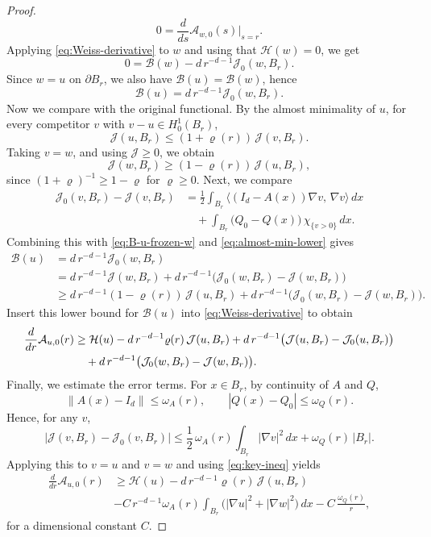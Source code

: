 \documentclass[reqno,11pt]{amsart}
\newcommand{\1}{\mathds{1}}  %
\numberwithin{equation}{section}
\begin{document}
\begin{proof}
\[
    0 = \frac{d}{ds}\mathcal A_{w,0}(s)\Big|_{s=r}.
\]
Applying \eqref{eq:Weiss-derivative} to $w$ and using that $\mathcal H(w) = 0$, we get
\[
    0 = \mathcal B(w)-d\,r^{-d-1}\mathcal J_0(w,B_r).
\]
Since $w=u$ on $\partial B_r$, we also have $\mathcal B(u)=\mathcal B(w)$, hence
\begin{equation}\label{eq:B-u-frozen-w}
\mathcal B(u)=d\,r^{-d-1}\mathcal J_0(w,B_r).
\end{equation}
Now we compare with the original functional. By the almost minimality of $u$, for every competitor $v$ with $v-u\in H^1_0(B_r)$,
\[
	\mathcal J(u,B_r)\le (1+\varrho(r))\,\mathcal J(v,B_r).
\]
Taking $v=w$, and using $\mathcal J\ge 0$, we obtain
\begin{equation}\label{eq:almost-min-lower}
	\mathcal J(w,B_r)\ge (1-\varrho(r))\,\mathcal J(u,B_r),
\end{equation}
since $(1+\varrho)^{-1}\ge 1-\varrho$ for $\varrho\ge 0$. Next, we compare 
\[
\begin{aligned}
	\mathcal J_0(v,B_r)-\mathcal J(v,B_r)
	&=\frac12\int_{B_r}\big\langle (I_d-A(x))\nabla v,\,\nabla v\big\rangle\,dx \\
	&\quad +\int_{B_r}\big(Q_0-Q(x)\big)\,\chi_{\{v>0\}}\,dx.
\end{aligned}
\]
Combining this with \eqref{eq:B-u-frozen-w} and \eqref{eq:almost-min-lower} gives
\begin{align*}
	\mathcal B(u)
	&= d\,r^{-d-1}\mathcal J_0(w,B_r) \\
	&= d\,r^{-d-1}\mathcal J(w,B_r)
	+d\,r^{-d-1}\big(\mathcal J_0(w,B_r)-\mathcal J(w,B_r)\big)\\
	&\ge d\,r^{-d-1}(1-\varrho(r))\,\mathcal J(u,B_r)
	+d\,r^{-d-1}\big(\mathcal J_0(w,B_r)-\mathcal J(w,B_r)\big).
\end{align*}
Insert this lower bound for $\mathcal B(u)$ into \eqref{eq:Weiss-derivative} to obtain
\begin{align}
\frac{d}{dr}\mathcal A_{u,0}(r)
&\ge \mathcal H(u)
-d\,r^{-d-1}\varrho(r)\,\mathcal J(u,B_r)
+d\,r^{-d-1}\big(\mathcal J(u,B_r)-\mathcal J_0(u,B_r)\big)\notag\\
&\quad +d\,r^{-d-1}\big(\mathcal J_0(w,B_r)-\mathcal J(w,B_r)\big). \label{eq:key-ineq}
\end{align}
Finally, we estimate the error terms. For $x\in B_r$, by continuity of $A$ and $Q$,
\[
\|A(x)-I_d\|\le \omega_A(r),
\qquad
|Q(x)-Q_0|\le \omega_Q(r).
\]
Hence, for any $v$,
\[
\big|\mathcal J(v,B_r)-\mathcal J_0(v,B_r)\big|
\le \frac12\,\omega_A(r)\int_{B_r}|\nabla v|^2\,dx + \omega_Q(r)\,|B_r|.
\]
Applying this to $v=u$ and $v=w$ and using \eqref{eq:key-ineq} yields
\begin{align*}
\frac{d}{dr}\mathcal A_{u,0}(r)
&\ge \mathcal H(u)
-d\,r^{-d-1}\varrho(r)\,\mathcal J(u,B_r)\\
& - C\,r^{-d-1}\omega_A(r)\!\int_{B_r}\big(|\nabla u|^2+|\nabla w|^2\big)\,dx
- C\,\frac{\omega_Q(r)}{r},
\end{align*}
for a dimensional constant $C$.


\end{proof}
\end{document}
